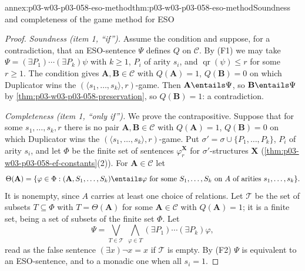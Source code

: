 \begin{annexitem}{annex:p03-w03-p03-058-eso-method}{thm:p03-w03-p03-058-eso-method}{Soundness and completeness of the game method for ESO}
\begin{proof}
\emph{Soundness (item 1, ``if'').} Assume the condition and suppose, for a
contradiction, that an ESO-sentence \(\Psi\) defines \(Q\) on
\(\mathcal C\). By (F1) we may take \(\Psi=(\exists P_1)\cdots(\exists
P_k)\psi\) with \(k\ge1\), \(P_i\) of arity \(s_i\), and
\(\operatorname{qr}(\psi)\le r\) for some \(r\ge1\). The condition gives
\(\mathbf A,\mathbf B\in\mathcal C\) with \(Q(\mathbf A)=1\),
\(Q(\mathbf B)=0\) on which Duplicator wins the
\((\langle s_1,\ldots,s_k\rangle,r)\)-game. Then
\(\mathbf A\entails\Psi\), so \(\mathbf B\entails\Psi\) by
\cref{thm:p03-w03-p03-058-preservation}, so \(Q(\mathbf B)=1\): a
contradiction.

\emph{Completeness (item 1, ``only if'').} We prove the contrapositive.
Suppose that for some \(s_1,\ldots,s_k,r\) there is no pair
\(\mathbf A,\mathbf B\in\mathcal C\) with \(Q(\mathbf A)=1\),
\(Q(\mathbf B)=0\) on which Duplicator wins the
\((\langle s_1,\ldots,s_k\rangle,r)\)-game. Put
\(\sigma'=\sigma\cup\{P_1,\ldots,P_k\}\), \(P_i\) of arity \(s_i\), and let
\(\Phi\) be the finite set of sentences \(\varphi^{\mathbf X}_r\) for
\(\sigma'\)-structures \(\mathbf X\)
(\cref{thm:p03-w03-p03-058-ef-constants}(2)). For \(\mathbf A\in\mathcal C\)
let
\[
 \Theta(\mathbf A)=\{\varphi\in\Phi:(\mathbf A,S_1,\ldots,S_k)\entails
 \varphi\text{ for some }S_1,\ldots,S_k\text{ on }A\text{ of arities }
 s_1,\ldots,s_k\}.
\]
It is nonempty, since \(A\) carries at least one choice of relations. Let
\(\mathcal T\) be the set of subsets \(T\subseteq\Phi\) with
\(T=\Theta(\mathbf A)\) for some \(\mathbf A\in\mathcal C\) with
\(Q(\mathbf A)=1\); it is a finite set, being a set of subsets of the
finite set \(\Phi\). Let
\[
 \Psi=\bigvee_{T\in\mathcal T}\ \bigwedge_{\varphi\in T}
 (\exists P_1)\cdots(\exists P_k)\varphi ,
\]
read as the false sentence \((\exists x)\neg x=x\) if \(\mathcal T\) is
empty. By (F2) \(\Psi\) is equivalent to an ESO-sentence, and to a monadic
one when all \(s_i=1\).


\end{proof}
\end{annexitem}
